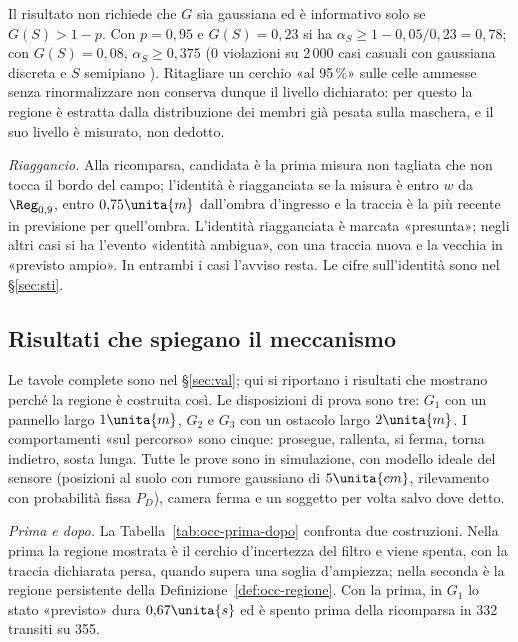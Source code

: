 Il risultato non richiede che $G$ sia gaussiana ed è informativo solo se $G(S)>1-p$. Con $p=0{,}95$ e $G(S)=0{,}23$ si ha $\alpha_S\ge1-0{,}05/0{,}23=0{,}78$; con $G(S)=0{,}08$, $\alpha_S\ge0{,}375$ (0 violazioni su 2\,000 casi casuali con gaussiana discreta e $S$ semipiano ). Ritagliare un cerchio «al 95\,\%» sulle celle ammesse senza rinormalizzare non conserva dunque il livello dichiarato: per questo la regione è estratta dalla distribuzione dei membri già pesata sulla maschera, e il suo livello è misurato, non dedotto.

\emph{Riaggancio.} Alla ricomparsa, candidata è la prima misura non tagliata che non tocca il bordo del campo; l'identità è riagganciata se la misura è entro $w$ da $\Reg_{0,9}$, entro $0{,}75\unita{m}$ dall'ombra d'ingresso e la traccia è la più recente in previsione per quell'ombra. L'identità riagganciata è marcata «presunta»; negli altri casi si ha l'evento «identità ambigua», con una traccia nuova e la vecchia in «previsto ampio». In entrambi i casi l'avviso resta. Le cifre sull'identità sono nel \S\ref{sec:sti}.

\subsection{Risultati che spiegano il meccanismo}\label{sec:occ-risultati}

Le tavole complete sono nel \S\ref{sec:val}; qui si riportano i risultati che mostrano perché la regione è costruita così. Le disposizioni di prova sono tre: $G_1$ con un pannello largo $1\unita{m}$, $G_2$ e $G_3$ con un ostacolo largo $2\unita{m}$. I comportamenti «sul percorso» sono cinque: prosegue, rallenta, si ferma, torna indietro, sosta lunga. Tutte le prove sono in simulazione, con modello ideale del sensore (posizioni al suolo con rumore gaussiano di $5\unita{cm}$, rilevamento con probabilità fissa $P_D$), camera ferma e un soggetto per volta salvo dove detto.

\emph{Prima e dopo.} La Tabella~\ref{tab:occ-prima-dopo} confronta due costruzioni. Nella prima la regione mostrata è il cerchio d'incertezza del filtro e viene spenta, con la traccia dichiarata persa, quando supera una soglia d'ampiezza; nella seconda è la regione persistente della Definizione~\ref{def:occ-regione}. Con la prima, in $G_1$ lo stato «previsto» dura $0{,}67\unita{s}$ ed è spento prima della ricomparsa in 332 transiti su 355.

